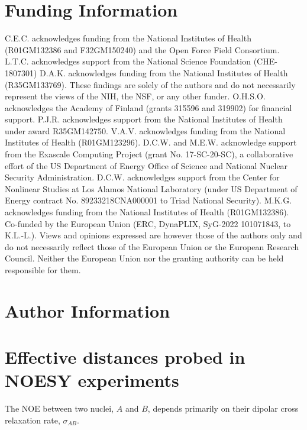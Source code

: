 \documentclass[9pt,review]{livecoms}
\begin{document}
\section*{Funding Information}

C.E.C. acknowledges funding from the National Institutes of Health (R01GM132386 and F32GM150240) and the
Open Force Field Consortium.
L.T.C. acknowledges support from the National Science Foundation (CHE-1807301)
D.A.K. acknowledges funding from the National Institutes of Health (R35GM133769).
These findings are solely of the authors and do not necessarily represent the views of the NIH,
the NSF, or any other funder.
O.H.S.O. acknowledges the Academy of Finland (grants 315596 and 319902) for financial
support.
P.J.R. acknowledges support from the National Institutes of Health under award R35GM142750.
V.A.V. acknowledges funding from the National Institutes of Health (R01GM123296).
D.C.W. and M.E.W. acknowledge support from the Exascale Computing Project (grant No.
17-SC-20-SC), a collaborative effort of the US Department of Energy Office of Science and
National Nuclear Security Administration.
D.C.W. acknowledges support from the Center for Nonlinear Studies at Los Alamos National
Laboratory (under US Department of Energy contract No. 89233218CNA000001 to Triad
National Security).
M.K.G. acknowledges funding from the National Institutes of Health (R01GM132386).
Co-funded by the European Union (ERC, DynaPLIX, SyG-2022 101071843, to K.L.-L.).
Views and opinions expressed are however those of the authors only and do not necessarily reflect those of the European Union or the European Research Council.
Neither the European Union nor the granting authority can be held responsible for them.

\section*{Author Information}
\makeorcid




\appendix
\section{Effective distances probed in NOESY experiments}
\label{app:noesy_distances}

The NOE between two nuclei, $A$ and $B$, depends primarily on their dipolar cross relaxation rate, $\sigma_{AB}$.
\end{document}
